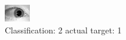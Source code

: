 \begin{figure}[h!]
\begin{center}
\includegraphics[width=0.60\columnwidth]{figures/ID1453_class_2_target_1.png}
\end{center}
\caption{ Classification: 2 actual target: 1}
\label{fig:ID1453_class_2_target_1}
\end{figure}
